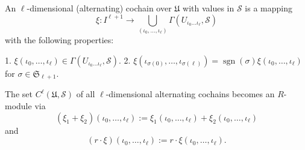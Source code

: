 An $\ell$-dimensional (alternating) cochain over $\mathfrak{U}$ with values in $\mathcal{S}$ is a mapping
$$\xi: I^{\ell+1} \rightarrow \bigcup_{(\iota_0, \dots, \iota_\ell)} \Gamma(U_{\iota_0 \dots \iota_\ell}, \mathcal{S})$$
with the following properties:

1. $\xi(\iota_0, \dots, \iota_\ell) \in \Gamma(U_{\iota_0 \dots \iota_\ell}, \mathcal{S})$.
2. $\xi(\iota_{\sigma(0)}, \dots, \iota_{\sigma(\ell)}) = \operatorname{sgn}(\sigma)\xi(\iota_0, \dots, \iota_\ell)$ for $\sigma \in \mathfrak{S}_{\ell+1}$.

The set $C^{\ell}(\mathfrak{U}, \mathcal{S})$ of all $\ell$-dimensional alternating cochains becomes an $R$-module via
$$(\xi_1 + \xi_2)(\iota_0, \dots, \iota_\ell) := \xi_1(\iota_0, \dots, \iota_\ell) + \xi_2(\iota_0, \dots, \iota_\ell)$$
and
$$(r \cdot \xi)(\iota_0, \dots, \iota_\ell) := r \cdot \xi(\iota_0, \dots, \iota_\ell).$$
